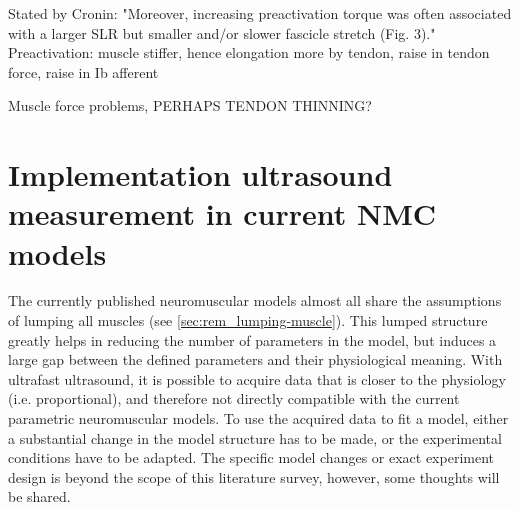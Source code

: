Stated by Cronin: "Moreover, increasing preactivation torque was often associated with a larger SLR but smaller and/or slower fascicle stretch (Fig. 3)." Preactivation: muscle stiffer, hence elongation more by tendon, raise in tendon force, raise in Ib afferent

Muscle force problems, PERHAPS TENDON THINNING?









\newpage


\section{Implementation ultrasound measurement in current NMC models}
\label{sec:rem_incompatibility}
The currently published neuromuscular models almost all share the assumptions of lumping all muscles (see \autoref{sec:rem_lumping-muscle}). This lumped structure greatly helps in reducing the number of parameters in the model, but induces a large gap between the defined parameters and their physiological meaning. With ultrafast ultrasound, it is possible to acquire data that is closer to the physiology (i.e. proportional), and therefore not directly compatible with the current parametric neuromuscular models. To use the acquired data to fit a model, either a substantial change in the model structure has to be made, or the experimental conditions have to be adapted. The specific model changes or exact experiment design is beyond the scope of this literature survey, however, some thoughts will be shared.




